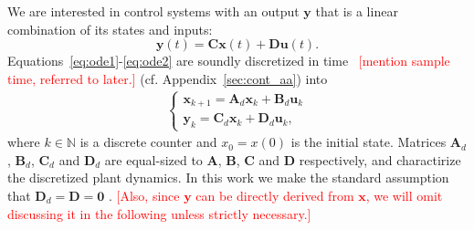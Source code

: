 \documentclass[sigconf]{llncs}
\newcommand{\mat}[1]{\boldsymbol{#1}}
\renewcommand{\vec}[1]{\boldsymbol{#1}}
\renewcommand{\note}[1]{\textcolor{red}{[#1]}}
\begin{document}
We are interested in control systems with an output $\vec{y}$ that is a linear combination of its states and inputs:
\begin{equation}
\label{eq:ode2}  
\vec{y}(t)=\mat{C}\vec{x}(t)+\mat{D}\vec{u}(t).
\end{equation}
%
Equations~\eqref{eq:ode1}-\eqref{eq:ode2} are soundly discretized in time~\cite{middleton1990digital,van1978computing} \note{mention sample time, referred to later.}
(cf. Appendix~\ref{sec:cont_aa}) into
\begin{align}
\label{eq:plant}
\left\{ 
\begin{array}{l}
\vec{x}_{k+1} = \mat{A}_d \vec{x}_k+ \mat{B}_d \vec{u}_k\\
\vec{y}_{k} = \mat{C}_d \vec{x}_k + \mat{D}_d \vec{u}_k, 
\end{array}
\right.
\end{align} 
%
where $k \in \mathbb N$ is a discrete counter and $x_{0}=x(0)$ is the initial state. 
Matrices $\mat{A}_d$, $\mat{B}_d$, $\mat{C}_d$ and $\mat{D}_d$ are equal-sized to $\mat{A}$, $\mat{B}$, $\mat{C}$ and $\mat{D}$ respectively,  
and charactirize the discretized plant dynamics. 
In this work we make the standard assumption that $\mat{D}_d=\mat{D}=\mat{0}$ \cite{Astrom08}.  
\note{Also, since $\vec{y}$ can be directly derived from $\vec{x}$, we will omit discussing it in the following unless strictly necessary.}

\end{document}
